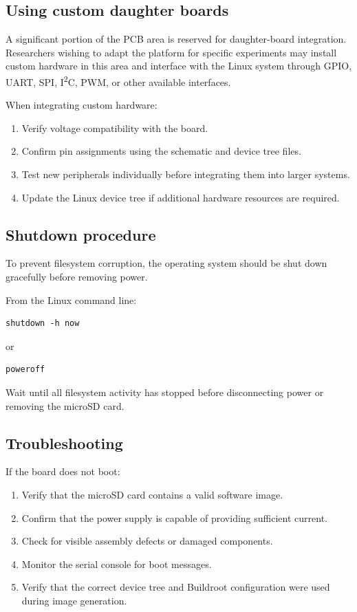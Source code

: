 \subsection{Using custom daughter boards}

A significant portion of the PCB area is reserved for daughter-board integration. 
Researchers wishing to adapt the platform for specific experiments may install 
custom hardware in this area and interface with the Linux system through GPIO, 
UART, SPI, I\textsuperscript{2}C, PWM, or other available interfaces.

When integrating custom hardware:

\begin{enumerate}
\item Verify voltage compatibility with the board.
\item Confirm pin assignments using the schematic and device tree files.
\item Test new peripherals individually before integrating them into larger systems.
\item Update the Linux device tree if additional hardware resources are required.
\end{enumerate}

\subsection{Shutdown procedure}

To prevent filesystem corruption, the operating system should be shut down 
gracefully before removing power.

From the Linux command line:

\begin{verbatim}
shutdown -h now
\end{verbatim}

or

\begin{verbatim}
poweroff
\end{verbatim}

Wait until all filesystem activity has stopped before disconnecting power 
or removing the microSD card.

\subsection{Troubleshooting}

If the board does not boot:

\begin{enumerate}
\item Verify that the microSD card contains a valid software image.
\item Confirm that the power supply is capable of providing sufficient current.
\item Check for visible assembly defects or damaged components.
\item Monitor the serial console for boot messages.
\item Verify that the correct device tree and Buildroot configuration were 
used during image generation.
\end{enumerate}

